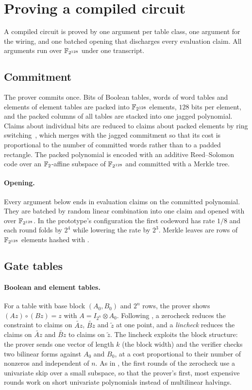 \section{Proving a compiled circuit}\label{sec:protocol}

A compiled circuit is proved by one argument per table class, one argument for the wiring, and one batched \WHIR{} opening that discharges every evaluation claim. All arguments run over $\mathbb{F}_{2^{128}}$ under one \Blake{} transcript.

\subsection{Commitment}

The prover commits once. Bits of Boolean tables, words of word tables and elements of element tables are packed into $\mathbb{F}_{2^{128}}$ elements, $128$ bits per element, and the packed columns of all tables are stacked into one jagged polynomial. Claims about individual bits are reduced to claims about packed elements by ring switching~\citep{fri-binius}, which \Flock{} merges with the jagged commitment so that its cost is proportional to the number of committed words rather than to a padded rectangle. The packed polynomial is encoded with an additive Reed--Solomon code over an $\mathbb{F}_{2}$-affine subspace of $\mathbb{F}_{2^{128}}$ and committed with a \Blake{} Merkle tree.

\paragraph{Opening.} Every argument below ends in evaluation claims on the committed polynomial. They are batched by random linear combination into one claim and opened with \WHIR{} over $\mathbb{F}_{2^{128}}$. In the prototype's configuration the first codeword has rate $1/8$ and each \WHIR{} round folds by $2^4$ while lowering the rate by $2^3$. Merkle leaves are rows of $\mathbb{F}_{2^{128}}$ elements hashed with \Blake{}.

\subsection{Gate tables}\label{sec:protocol-tables}

\paragraph{Boolean and element tables.} For a table with base block $(A_0, B_0)$ and $2^n$ rows, the prover shows $(A z)\circ(B z) = z$ with $A = I_{2^n}\otimes A_0$. Following \Flock{}, a zerocheck reduces the constraint to claims on $\widetilde{Az}$, $\widetilde{Bz}$ and $\tilde z$ at one point, and a \emph{lincheck} reduces the claims on $\widetilde{Az}$ and $\widetilde{Bz}$ to claims on $\tilde z$. The lincheck exploits the block structure: the prover sends one vector of length $k$ (the block width) and the verifier checks two bilinear forms against $A_0$ and $B_0$, at a cost proportional to their number of nonzeros and independent of $n$. As in \Flock{}, the first rounds of the zerocheck use a univariate skip over a small subspace, so that the prover's first, most expensive rounds work on short univariate polynomials instead of multilinear halvings.

